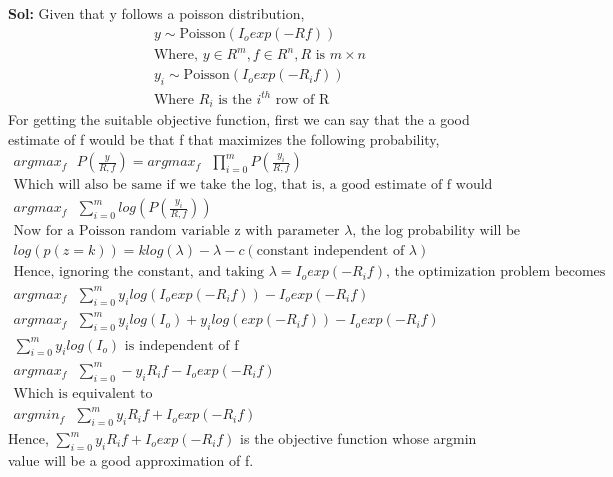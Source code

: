 \documentclass[11pt]{article}
\begin{document}
\begin{enumerate}
\textbf{Sol:}
Given that y follows a poisson distribution,
\begin{gather*}
    y \sim \text{Poisson}(I_o exp(-Rf))\\
    \text{Where, } y\in R^m, f\in R^n, R \text{ is } m\times n \\
    y_i\sim \text{Poisson}(I_o exp(-R_if))\\
    \text{Where $R_i$ is the $i^{th}$ row of R}
\end{gather*}
For getting the suitable objective function, first we can say that the a good estimate of f would be that f that maximizes the following probability,
\begin{gather*}
   argmax_f\text{ } {P\left(\frac{y}{R, f}\right)} =  argmax_f\text{ } \prod_{i=0}^m P\left(\frac{y_i}{R, f}\right)\\
   \text{Which will also be same if we take the log, that is, a good estimate of f would be}\\
   argmax_f \text{ } \sum_{i=0}^m log\left(P\left(\frac{y_i}{R, f}\right)\right)\\
   \text{Now for a Poisson random variable z with parameter $\lambda$, the log probability will be}\\
   log(p(z=k)) = klog(\lambda) - \lambda - c (\text{constant independent of }\lambda )\\
   \text{Hence, ignoring the constant, and taking $\lambda = I_o exp(-R_if)$, the optimization problem becomes}\\
   argmax_f \text{ } \sum_{i=0}^m y_ilog(I_o exp(-R_if)) - I_o exp(-R_if)\\
   argmax_f \text{ } \sum_{i=0}^m y_ilog(I_o) + y_ilog(exp(-R_if)) - I_o exp(-R_if)\\
    \sum_{i=0}^m y_ilog(I_o) \text{ is independent of f}\\
    argmax_f \text{ } \sum_{i=0}^m -y_iR_if - I_o exp(-R_if)\\
    \text{Which is equivalent to}\\
    argmin_f \text{ } \sum_{i=0}^m y_iR_if + I_o exp(-R_if)
\end{gather*}
Hence, $\sum_{i=0}^m y_iR_if + I_o exp(-R_if)$ is the objective function whose argmin value will be a good approximation of f.\\


\end{enumerate}
\end{document}

